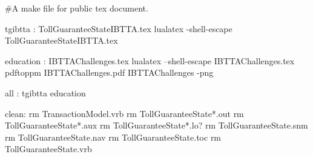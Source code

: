 #A make file for public tex document.


tgibtta : TollGuaranteeStateIBTTA.tex
	lualatex -shell-escape TollGuaranteeStateIBTTA.tex

education : IBTTAChallenges.tex
	lualatex --shell-escape IBTTAChallenges.tex
	pdftoppm IBTTAChallenges.pdf IBTTAChallenges -png

all : tgibtta education

clean: 
	rm TransactionModel.vrb
	rm TollGuaranteeState*.out
	rm TollGuaranteeState*.aux
	rm TollGuaranteeState*.lo?
	rm TollGuaranteeState.snm
	rm TollGuaranteeState.nav
	rm TollGuaranteeState.toc
	rm TollGuaranteeState.vrb
